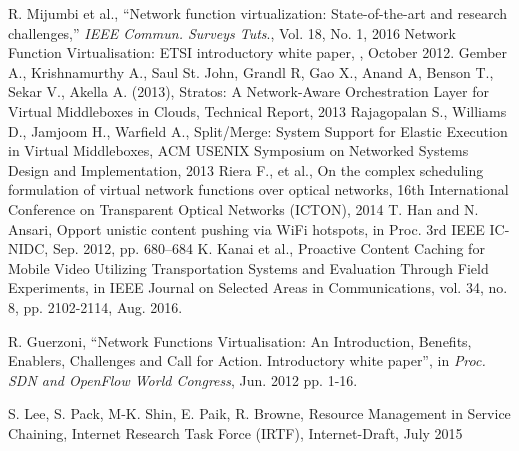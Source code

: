 \documentclass[journal]{IEEEtran}
\begin{document}
  \begin{thebibliography}{1}

    R. Mijumbi et al., ``Network function virtualization: State-of-the-art and
    research challenges,'' \emph{IEEE Commun. Surveys Tuts}., Vol. 18, No. 1, 2016
    Network Function Virtualisation: ETSI introductory white paper,
    , October 2012.
    Gember A., Krishnamurthy A., Saul St. John, Grandl R, Gao X., Anand A, Benson T., Sekar V., Akella A. (2013), Stratos: A Network-Aware Orchestration Layer for Virtual Middleboxes in Clouds, Technical Report, 2013
    Rajagopalan S., Williams D., Jamjoom H., Warfield A., Split/Merge: System Support for Elastic Execution in Virtual Middleboxes, ACM USENIX Symposium on Networked Systems Design and Implementation, 2013
    Riera F., et al., On the complex scheduling formulation of virtual network functions over optical networks, 16th International Conference on Transparent Optical Networks (ICTON), 2014
    T.   Han   and   N.   Ansari,   Opport
    unistic   content   pushing   via   WiFi hotspots, in
    Proc. 3rd IEEE IC-NIDC, Sep. 2012, pp. 680–684
    K. Kanai et al., Proactive Content Caching for Mobile Video Utilizing Transportation Systems and Evaluation Through Field Experiments, in IEEE Journal on Selected Areas in Communications, vol. 34, no. 8, pp. 2102-2114, Aug. 2016.

    R. Guerzoni, ``Network Functions Virtualisation: An Introduction, Benefits,  Enablers,  Challenges  and  Call  for  Action.  Introductory  white paper'', in \emph{Proc. SDN and OpenFlow World Congress}, Jun. 2012 pp. 1-16.

    S. Lee, S. Pack,  M-K. Shin, E. Paik, R. Browne, Resource Management in Service Chaining, Internet Research Task Force (IRTF), Internet-Draft, July 2015


\end{thebibliography}
\end{document}
